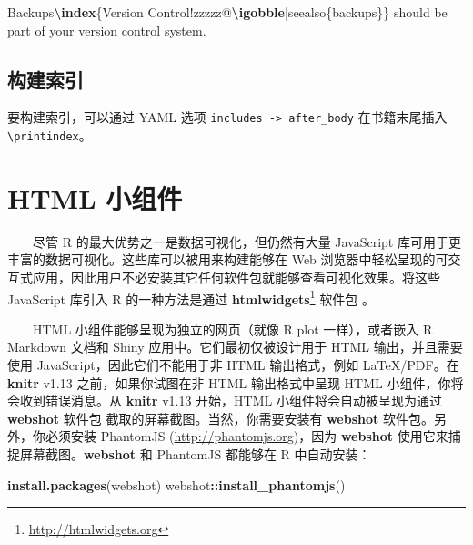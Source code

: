 \documentclass[
  12pt,
]{krantz}
\newenvironment{Shaded}{\begin{snugshade}}{\end{snugshade}}
\newcommand{\FunctionTok}[1]{\textcolor[rgb]{0.13,0.29,0.53}{\textbf{#1}}}
\newcommand{\NormalTok}[1]{#1}
\newcommand{\SpecialCharTok}[1]{\textcolor[rgb]{0.81,0.36,0.00}{\textbf{#1}}}
\newcommand{\StringTok}[1]{\textcolor[rgb]{0.31,0.60,0.02}{#1}}
\renewcommand{\href}[2]{#2\footnote{\url{#1}}}
\theoremstyle{definition}
\theoremstyle{definition}
\theoremstyle{definition}
\theoremstyle{definition}
\theoremstyle{remark}
\begin{document}
\begin{Shaded}
\begin{Highlighting}[]
\NormalTok{Backups}\FunctionTok{\textbackslash{}index}\NormalTok{\{Version Control!zzzzz@}\FunctionTok{\textbackslash{}igobble}\NormalTok{|seealso\{backups\}\}}
\NormalTok{should be part of your version control system.}
\end{Highlighting}
\end{Shaded}

\hypertarget{ux6784ux5efaux7d22ux5f15}{%
\subsection{构建索引}\label{ux6784ux5efaux7d22ux5f15}}

要构建索引，可以通过 YAML 选项 \texttt{includes\ -\textgreater{}\ after\_body} 在书籍末尾插入 \texttt{\textbackslash{}printindex}。

\hypertarget{html-ux5c0fux7ec4ux4ef6}{%
\section{HTML 小组件}\label{html-ux5c0fux7ec4ux4ef6}}

  尽管 R 的最大优势之一是数据可视化，但仍然有大量 JavaScript 库可用于更丰富的数据可视化。这些库可以被用来构建能够在 Web 浏览器中轻松呈现的可交互式应用，因此用户不必安装其它任何软件包就能够查看可视化效果。将这些 JavaScript 库引入 R 的一种方法是通过 \href{http://htmlwidgets.org}{\textbf{htmlwidgets}} 软件包 \citep{R-htmlwidgets}。

  HTML 小组件能够呈现为独立的网页（就像 R plot 一样），或者嵌入 R Markdown 文档和 Shiny 应用中。它们最初仅被设计用于 HTML 输出，并且需要使用 JavaScript，因此它们不能用于非 HTML 输出格式，例如 LaTeX/PDF。在 \textbf{knitr} v1.13 之前，如果你试图在非 HTML 输出格式中呈现 HTML 小组件，你将会收到错误消息。从 \textbf{knitr} v1.13 开始，HTML 小组件将会自动被呈现为通过 \textbf{webshot} 软件包 \citep{R-webshot} 截取的屏幕截图。当然，你需要安装有 \textbf{webshot} 软件包。另外，你必须安装 PhantomJS (\url{http://phantomjs.org})，因为 \textbf{webshot} 使用它来捕捉屏幕截图。\textbf{webshot} 和 PhantomJS 都能够在 R 中自动安装：

\begin{Shaded}
\begin{Highlighting}[]
\FunctionTok{install.packages}\NormalTok{(}\StringTok{\textquotesingle{}webshot\textquotesingle{}}\NormalTok{)}
\NormalTok{webshot}\SpecialCharTok{::}\FunctionTok{install\_phantomjs}\NormalTok{()}
\end{Highlighting}
\end{Shaded}
\end{document}
